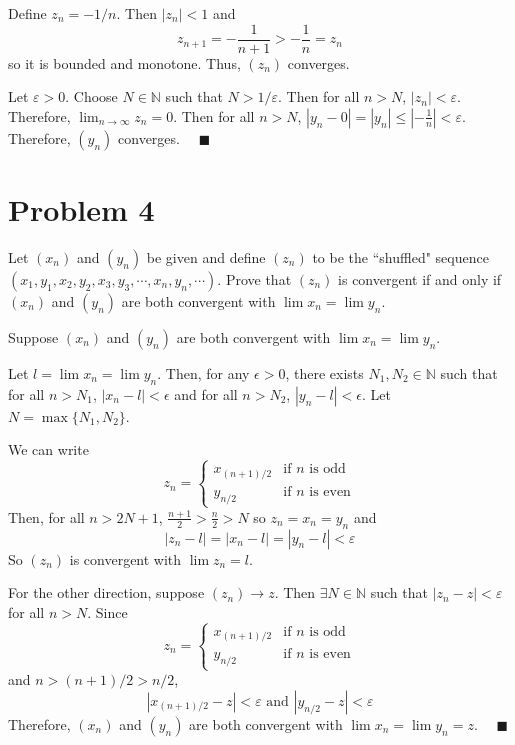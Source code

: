 \documentclass[10pt]{article}
\newcommand{\qed}{\quad \blacksquare}
\newcommand{\abs}[1]{\left\vert #1 \right\vert}
\newcommand{\ep}{\varepsilon}
\newcommand{\N}{\mathbb{N}}
\begin{document}
\begin{enumerate}
            Define $z_n = -1/n$. Then $\abs{z_n} < 1$ and 
            \[z_{n+1} = -\frac{1}{n+1} > -\frac{1}{n} = z_n\]
            so it is bounded and monotone. Thus, $(z_n)$ converges. 

            Let $\ep > 0$. Choose $N \in \N$ such that $N > 1/\ep$. Then for all $n > N$, $\abs{z_n} < \ep$. Therefore, $\lim_{n\to \infty} z_n = 0$. Then for all $n > N$, $\abs{y_n - 0} = \abs{y_n} \leq \abs{-\frac{1}{n}} < \ep$. Therefore, $(y_n)$ converges. $\qed$
           
        \color{black}
    
\end{enumerate}

\pagebreak
\section*{Problem 4}
Let $(x_n)$ and $(y_n)$ be given and define $(z_n)$ to be the ``shuffled" sequence $(x_1,y_1,x_2,y_2,x_3,y_3,\cdots,x_n,y_n,\cdots)$. Prove that $(z_n)$ is convergent if and only if $(x_n)$ and $(y_n)$ are both convergent with $\lim x_n=\lim y_n$.

    \color{blue}
        Suppose $(x_n)$ and $(y_n)$ are both convergent with $\lim x_n=\lim y_n$. 
        
        Let $l = \lim x_n = \lim y_n$. Then, for any $\epsilon > 0$, there exists $N_1, N_2 \in \N$ such that for all $n > N_1$, $\abs{x_n - l} < \epsilon$ and for all $n > N_2$, $\abs{y_n - l} < \epsilon$. Let $N = \max\{N_1, N_2\}$. 
        
        We can write 
        \[z_n = \begin{cases}
            x_{(n+1)/2} & \text{if } n \text{ is odd}\\
            y_{n/2} & \text{if } n \text{ is even}
        \end{cases}\]
        Then, for all $n > 2N + 1$, $\frac{n+1}{2} > \frac{n}{2} > N$ so $z_n = x_n = y_n$ and 
        \[\abs{z_n - l} = \abs{x_n - l} = \abs{y_n - l} < \ep\]
        So $(z_n)$ is convergent with $\lim z_n = l$.

        For the other direction, suppose $(z_n) \to z$. Then $\exists N \in \N$ such that $\abs{z_n - z} < \ep$ for all $n > N$. Since 
        \[z_n = \begin{cases}
            x_{(n+1)/2} & \text{if } n \text{ is odd}\\
            y_{n/2} & \text{if } n \text{ is even}
        \end{cases}\]
        and $n > (n+1)/2 > n/2$, 
        \[\abs{x_{(n+1)/2} - z} < \ep \text{ and } \abs{y_{n/2} - z} < \ep\]
        Therefore, $(x_n)$ and $(y_n)$ are both convergent with $\lim x_n = \lim y_n = z$. $\qed$
    \color{black}
\end{document}
